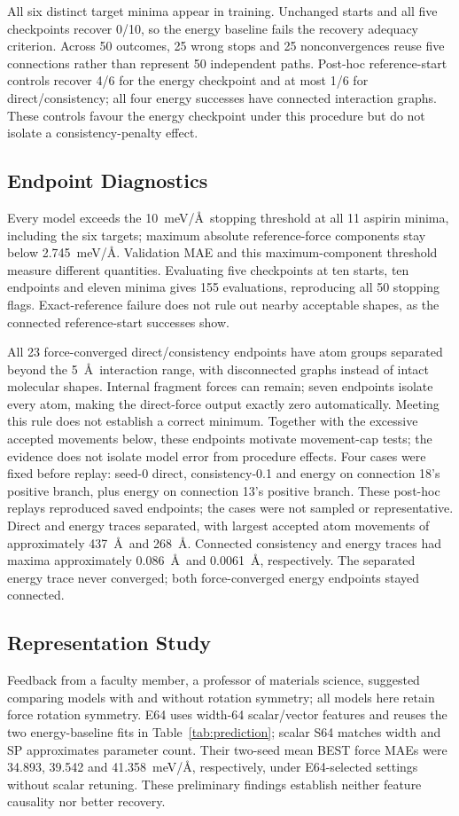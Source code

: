\documentclass{article}
\begin{document}
All six distinct target minima appear in training. Unchanged starts and all five checkpoints recover 0/10, so the energy baseline fails the recovery adequacy criterion. Across 50 outcomes, 25 wrong stops and 25 nonconvergences reuse five connections rather than represent 50 independent paths. Post-hoc reference-start controls recover 4/6 for the energy checkpoint and at most 1/6 for direct/consistency; all four energy successes have connected interaction graphs. These controls favour the energy checkpoint under this procedure but do not isolate a consistency-penalty effect.




\subsection{Endpoint Diagnostics}
Every model exceeds the 10~meV/\AA\ stopping threshold at all 11 aspirin minima, including the six targets; maximum absolute reference-force components stay below 2.745~meV/\AA. Validation MAE and this maximum-component threshold measure different quantities. Evaluating five checkpoints at ten starts, ten endpoints and eleven minima gives 155 evaluations, reproducing all 50 stopping flags. Exact-reference failure does not rule out nearby acceptable shapes, as the connected reference-start successes show.

All 23 force-converged direct/consistency endpoints have atom groups separated beyond the 5~\AA\ interaction range, with disconnected graphs instead of intact molecular shapes. Internal fragment forces can remain; seven endpoints isolate every atom, making the direct-force output exactly zero automatically. Meeting this rule does not establish a correct minimum. Together with the excessive accepted movements below, these endpoints motivate movement-cap tests; the evidence does not isolate model error from procedure effects.
Four cases were fixed before replay: seed-0 direct, consistency-0.1 and energy on connection 18's positive branch, plus energy on connection 13's positive branch. These post-hoc replays reproduced saved endpoints; the cases were not sampled or representative. Direct and energy traces separated, with largest accepted atom movements of approximately 437~\AA\ and 268~\AA. Connected consistency and energy traces had maxima approximately 0.086~\AA\ and 0.0061~\AA, respectively. The separated energy trace never converged; both force-converged energy endpoints stayed connected.

\subsection{Representation Study}
Feedback from a faculty member, a professor of materials science, suggested comparing models with and without rotation symmetry; all models here retain force rotation symmetry. E64 uses width-64 scalar/vector features and reuses the two energy-baseline fits in Table~\ref{tab:prediction}; scalar S64 matches width and SP approximates parameter count. Their two-seed mean BEST force MAEs were 34.893, 39.542 and 41.358~meV/\AA, respectively, under E64-selected settings without scalar retuning. These preliminary findings establish neither feature causality nor better recovery.
\end{document}
